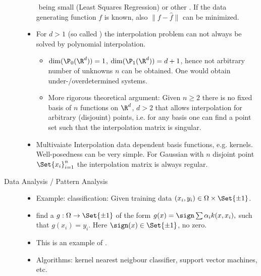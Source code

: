 \begin{description}
\begin{itemize}
\begin{math}
                \end{math}
                being small (Least Squares Regression) or other .
                If the data generating function $f$ is known, also $\|f - \hat f\|$ can be minimized.
            \item
                For $d > 1$ (so called ) the interpolation problem can not always be solved by polynomial interpolation.
                \begin{itemize}
                    \item
                        $\dim(\P_0(\R^d)) = 1$, $\dim(\P_1(\R^d)) = d + 1$, hence not arbitrary number of unknowns $n$ can be obtained.
                        One would obtain under-/overdetermined systems.
                    \item
                        More rigorous theoretical argument:
                        Given $n \ge 2$ there is no fixed basis of $n$ functions on $\R^d$, $d > 2$ that allows interpolation for arbitrary (disjouint) points, i.e. for any basis one can find a point set such that the interpolation matrix is singular. 
                \end{itemize}
            \item
                Multivaiate Interpolation  data dependent basis functions, e.g. kernels. Well-posedness can be very simple.
                For Gaussian with $n$ disjoint point $\Set{x_i}_{i=1}^n$ the interpolation matrix is always regular.
        \end{itemize}
    \item[Data Analysis / Pattern Analysis]
        \begin{itemize}
            \item
                Example: classification: Given training data $(x_i, y_i) \in \Omega \times \Set{\pm 1}$.
            \item
                find a  $g: \Omega \to \Set{\pm 1}$ of the form
                \begin{math}
                    g(x) = \sign \sum \alpha_i k(x,x_i),
                \end{math}
                such that $g(x_i) = y_i$.
                Here $\sign(x) \in \Set{\pm 1}$, no zero.
            \item
                This is an example of .
            \item
                Algorithms: kernel nearest neigbour classifier, support vector machines, etc.

\end{itemize}
\end{description}
